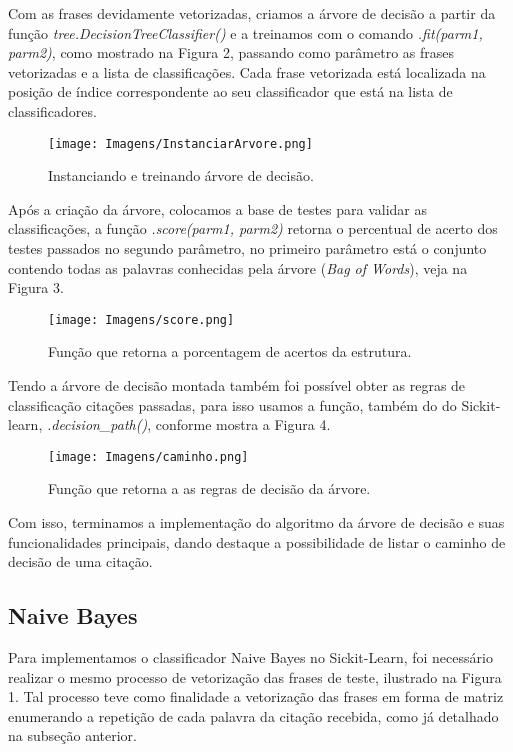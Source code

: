 \documentclass[preprint,12pt,times]{elsarticle}
\begin{document}
	 Com as frases devidamente vetorizadas, criamos a árvore de decisão a partir da função \textit{tree.DecisionTreeClassifier()} e a treinamos com o comando \textit{.fit(parm1, parm2)}, como mostrado na Figura 2, passando como parâmetro as frases vetorizadas e a lista de classificações. Cada frase vetorizada está localizada na posição de índice correspondente ao seu classificador que está na lista de classificadores.
	 
	 \begin{figure}[h]
		 \centering\texttt{[image: Imagens/InstanciarArvore.png]}
	 	\caption{Instanciando e treinando árvore de decisão.}
	 \end{figure}
	
	Após a criação da árvore, colocamos a base de testes para validar as classificações, a função \textit{.score(parm1, parm2)} retorna o percentual de acerto dos testes passados no segundo parâmetro, no primeiro parâmetro está o conjunto contendo todas as palavras conhecidas pela árvore (\textit{Bag of Words}), veja na Figura 3.
	
	\begin{figure}[h]
	\centering\texttt{[image: Imagens/score.png]}
	\caption{Função que retorna a porcentagem de acertos da estrutura.}
	\end{figure}

	Tendo a árvore de decisão montada também foi possível obter as regras de classificação citações passadas, para isso usamos a função, também do do Sickit-learn, \textit{.decision\_path()}, conforme mostra a Figura 4. 
	
	\begin{figure}[h]
	\centering\texttt{[image: Imagens/caminho.png]}
	\caption{Função que retorna a as regras de decisão da árvore.}
	\end{figure}
	
	Com isso, terminamos a implementação do algoritmo da árvore de decisão e suas funcionalidades principais, dando destaque a possibilidade de listar o caminho de decisão de uma citação.
	
	\subsection{Naive Bayes}
	Para implementamos o classificador Naive Bayes no Sickit-Learn, foi necessário realizar o mesmo processo de vetorização das frases de teste, ilustrado na Figura 1. Tal processo teve como finalidade a vetorização das frases em forma de matriz enumerando a repetição de cada palavra da citação recebida, como já detalhado na subseção anterior.
		
\end{document}
